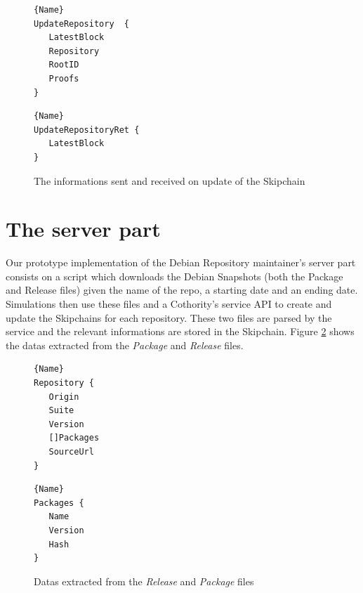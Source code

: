 \documentclass[11pt, upma4paper, twoside, openany, parskip=half]{book}
\begin{document}
\begin{figure}[H]
\noindent\begin{minipage}[t]{.45\textwidth}
\begin{lstlisting}[frame=tlrb,basicstyle=\ttfamily]{Name}
UpdateRepository  {
   LatestBlock
   Repository  
   RootID
   Proofs 
}
\end{lstlisting}
\end{minipage}\hfill
\begin{minipage}[t]{.45\textwidth}
\begin{lstlisting}[frame=tlrb,basicstyle=\ttfamily]{Name}
UpdateRepositoryRet {
   LatestBlock
}
\end{lstlisting}
\end{minipage}
\caption{The informations sent and received on update of the Skipchain}
\label{update_messages}
\end{figure}


\section{The server part}
Our prototype implementation of the Debian Repository maintainer's server part consists on a script which downloads the Debian Snapshots \cite{_snapshot.debian.org_????} (both the Package and Release files) given the name of the repo, a starting date and an ending date. Simulations then use these files and a Cothority's service API to create and update the Skipchains for each repository. These two files are parsed by the service and the relevant informations are stored in the Skipchain. Figure \ref{stored_skipchain} shows the datas extracted from the \emph{Package} and \emph{Release} files.

\begin{figure}[H]
\noindent\begin{minipage}[t]{.45\textwidth}
\begin{lstlisting}[frame=tlrb,basicstyle=\ttfamily]{Name}
Repository {
   Origin
   Suite 
   Version 
   []Packages
   SourceUrl
}
\end{lstlisting}
\end{minipage}\hfill
\begin{minipage}[t]{.45\textwidth}
\begin{lstlisting}[frame=tlrb,basicstyle=\ttfamily]{Name}
Packages {
   Name 
   Version
   Hash 
}
\end{lstlisting}
\end{minipage}
\caption{Datas extracted from the \emph{Release} and \emph{Package} files}
\label{stored_skipchain}
\end{figure}
\end{document}

